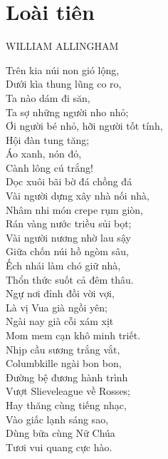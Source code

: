 \section{Loài tiên}

\begin{large}
  \begin{center}
    \uppercase{William Allingham}
  \end{center}
\end{large}

\noindent
Trên kia núi non gió lộng,\\
\indent
Dưới kìa thung lũng co ro,\\
Ta nào dám đi săn,\\
\indent
Ta sợ những người nho nhỏ;\\
Ơi người bé nhỏ, hỡi người tốt tính,\\
\indent
Hội đàn tung tăng;\\
Áo xanh, nón đỏ,\\
\indent
Cành lông cú trắng!\\
Dọc xuôi bãi bờ đá chồng đá\\
\indent
Vài người dựng xây nhà nối nhà,\\
Nhâm nhi món crepe rụm giòn,\\
\indent
Rán vàng nước triều sủi bọt;\\
Vài người nương nhờ lau sậy\\
\indent
Giữa chốn núi hồ ngòm sâu,\\
Ếch nhái làm chó giữ nhà,\\
\indent
Thổn thức suốt cả đêm thâu.\\

\noindent
Ngự nơi đỉnh đồi vời vợi,\\
\indent
Là vị Vua già ngồi yên;\\
Ngài nay già cỗi xám xịt\\
\indent
Mom mem cạn khô minh triết.\\
Nhịp cầu sương trắng vắt,\\
\indent
Columbkille ngài bon bon,\\
Đường bệ đương hành trình\\
\indent
Vượt Slieveleague về Rosses;\\
Hay thăng cùng tiếng nhạc,\\
\indent
Vào giấc lạnh sáng sao,\\
Dùng bữa cùng Nữ Chúa\\
\indent
Tươi vui quang cực hào.\\

